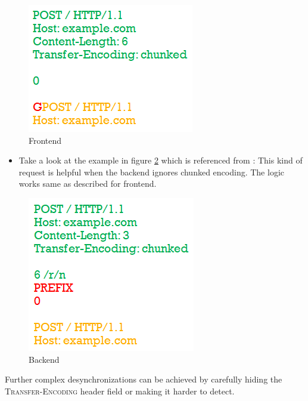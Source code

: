 \begin{figure}
	\includegraphics{images/Frontend}
	\caption{Frontend}
	\label{fig:Frontend}
\end{figure} 

\begin{itemize}
	\item Take a look at the example in figure \ref{fig:Backend} which is referenced from \cite{b6}: This kind of request is helpful when the backend ignores chunked encoding. The logic works same as described for frontend.
\end{itemize}
\begin{figure}
	\includegraphics{images/Backend}
	\caption{Backend}
	\label{fig:Backend}
\end{figure}

Further complex desynchronizations can be achieved by carefully hiding the \textsc{Transfer-Encoding} header field or making it harder to detect. 